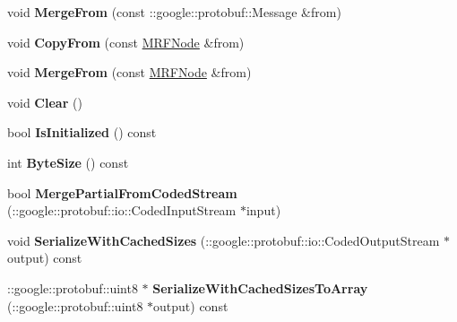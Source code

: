 \begin{DoxyCompactItemize}
\item 
\hypertarget{classgraph_1_1MRFNode_a9c35a74300cf3dca0218bcaeab056068}{
void {\bfseries MergeFrom} (const ::google::protobuf::Message \&from)}
\label{classgraph_1_1MRFNode_a9c35a74300cf3dca0218bcaeab056068}

\item 
\hypertarget{classgraph_1_1MRFNode_ab7f56050e7e981a5aea088fc4703a03b}{
void {\bfseries CopyFrom} (const \hyperlink{classgraph_1_1MRFNode}{MRFNode} \&from)}
\label{classgraph_1_1MRFNode_ab7f56050e7e981a5aea088fc4703a03b}

\item 
\hypertarget{classgraph_1_1MRFNode_ac4758815f0eb1ccb68720627100fbeb5}{
void {\bfseries MergeFrom} (const \hyperlink{classgraph_1_1MRFNode}{MRFNode} \&from)}
\label{classgraph_1_1MRFNode_ac4758815f0eb1ccb68720627100fbeb5}

\item 
\hypertarget{classgraph_1_1MRFNode_a610d843b6af3c9943e096adae1c878b9}{
void {\bfseries Clear} ()}
\label{classgraph_1_1MRFNode_a610d843b6af3c9943e096adae1c878b9}

\item 
\hypertarget{classgraph_1_1MRFNode_a4ee069fb613a4c42ce0b46a092905989}{
bool {\bfseries IsInitialized} () const }
\label{classgraph_1_1MRFNode_a4ee069fb613a4c42ce0b46a092905989}

\item 
\hypertarget{classgraph_1_1MRFNode_ab4cddf5ea1745f095b447d80a7e317b8}{
int {\bfseries ByteSize} () const }
\label{classgraph_1_1MRFNode_ab4cddf5ea1745f095b447d80a7e317b8}

\item 
\hypertarget{classgraph_1_1MRFNode_a7d517e721e300ebe179ef71f53ee2665}{
bool {\bfseries MergePartialFromCodedStream} (::google::protobuf::io::CodedInputStream $\ast$input)}
\label{classgraph_1_1MRFNode_a7d517e721e300ebe179ef71f53ee2665}

\item 
\hypertarget{classgraph_1_1MRFNode_a7d0379969f1c04b3753f3af41fcdcd8d}{
void {\bfseries SerializeWithCachedSizes} (::google::protobuf::io::CodedOutputStream $\ast$output) const }
\label{classgraph_1_1MRFNode_a7d0379969f1c04b3753f3af41fcdcd8d}

\item 
\hypertarget{classgraph_1_1MRFNode_a3c686681d6b3afada8c8119bc167946f}{
::google::protobuf::uint8 $\ast$ {\bfseries SerializeWithCachedSizesToArray} (::google::protobuf::uint8 $\ast$output) const }
\label{classgraph_1_1MRFNode_a3c686681d6b3afada8c8119bc167946f}


\end{DoxyCompactItemize}
